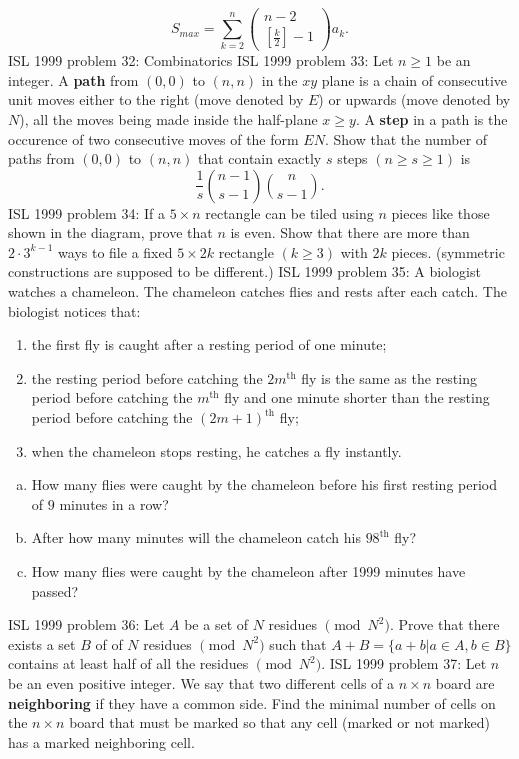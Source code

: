 \[ S_{max}= \sum^n_{k=2}
\begin{pmatrix} n -2 \\
[\frac{k}{2}] - 1\end{pmatrix}
a_k. \] 
ISL 1999 problem 32:  Combinatorics 
ISL 1999 problem 33:  Let $n \geq 1$ be an integer. A \textbf{path} from $(0,0)$ to $(n,n)$ in the $xy$ plane is a chain of consecutive unit moves either to the right (move denoted by $E$) or upwards (move denoted by $N$), all the moves being made inside the half-plane $x \geq y$. A \textbf{step} in a path is the occurence of two consecutive moves of the form $EN$. Show that the number of paths from $(0,0)$ to $(n,n)$ that contain exactly $s$ steps $(n \geq s \geq 1)$ is
\[ \frac{1}{s} \binom{n-1}{s-1} \binom{n}{s-1}. \] 
ISL 1999 problem 34:  If a $5 \times n$ rectangle can be tiled using $n$ pieces like those shown in the diagram, prove that $n$ is even. Show that there are more than $2 \cdot 3^{k-1}$ ways to file a fixed $5 \times 2k$ rectangle $(k \geq 3)$ with $2k$ pieces. (symmetric constructions are supposed to be different.) 
ISL 1999 problem 35:  A biologist watches a chameleon. The chameleon catches flies and rests after each catch. The biologist notices that:
\begin{enumerate}
  \item the first fly is caught after a resting period of one minute;
  \item the resting period before catching the $2m^\text{th}$ fly is the same as the resting period before catching the $m^\text{th}$ fly and one minute shorter than the resting period before catching the $(2m+1)^\text{th}$ fly;
  \item when the chameleon stops resting, he catches a fly instantly.
\end{enumerate}
\begin{enumerate}[a.]
  \item How many flies were caught by the chameleon before his first resting period of $9$ minutes in a row?
  \item After how many minutes will the chameleon catch his $98^\text{th}$ fly?
  \item How many flies were caught by the chameleon after 1999 minutes have passed?
\end{enumerate} 
ISL 1999 problem 36:  Let $A$ be a set of $N$ residues $\pmod{N^2}$. Prove that there exists a set $B$ of of $N$ residues $\pmod{N^2}$ such that $A + B = \{a+b|a \in A, b \in B\}$ contains at least half of all the residues $\pmod{N^2}$. 
ISL 1999 problem 37:  Let $n$ be an even positive integer. We say that two different cells of a $n \times n$ board are \textbf{neighboring} if they have a common side. Find the minimal number of cells on the $n \times n$ board that must be marked so that any cell (marked or not marked) has a marked neighboring cell. 

